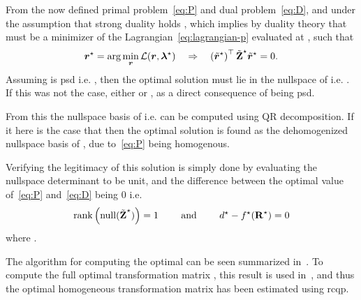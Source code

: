 From the now defined primal problem~\ref{eq:P} and dual problem~\ref{eq:D}, and under the assumption that strong duality holds , which implies by duality theory that  must be a minimizer of the Lagrangian~\ref{eq:lagrangian-p} evaluated at \mvar{\tilde{\vec{\lambda}}^\star}, such that
%
\begin{equation}
	\bm{r}^\star = \arg\min_{\bm{r}} \mathcal{L}(\bm{r},\bm{\lambda}^\star) \quad \Rightarrow \quad \left( \tilde{\bm{r}}^\star \right)^\top \tilde{\bm{\mathrm{Z}}}^\star \tilde{\bm{r}}^\star = 0.
\end{equation}
Assuming  is \gls{psd} i.e. , then the optimal solution  must lie in the nullspace of  i.e. . If this was not the case, either  or , as a direct consequence of  being \gls{psd}. \medskip

From this the nullspace basis  of  i.e.  can be computed using QR decomposition. If it here is the case that  then the optimal solution  is found as the dehomogenized nullspace basis of , due to~\ref{eq:P} being homogenous. \medskip

Verifying the legitimacy of this solution is simply done by evaluating the nullspace determinant to be unit, and the difference between the optimal value of~\ref{eq:P} and~\ref{eq:D} being \num{0} i.e.
%
\begin{equation}
	\text{rank} \left(\text{null}( \tilde{\bm{\mathrm{Z}}}^\star )\right) = 1 \qquad \text{ and } \qquad  d^\star - f^\star(\bm{\mathrm{R}}^\star) = 0
\end{equation}
where . \medskip

The algorithm for computing the optimal \tf[R]{\star}{} can be seen summarized in~. To compute the full optimal transformation matrix \tf[T]{\star}{}, this result is used in~, and thus the optimal homogeneous transformation matrix has been estimated using \gls{rcqp}.

